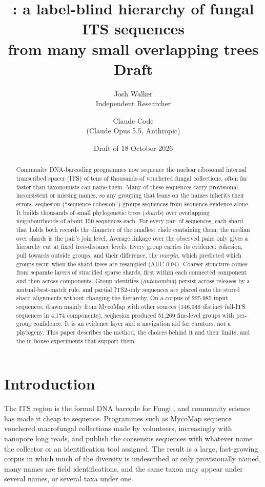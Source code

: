 \documentclass[11pt,a4paper]{article}
\title{\seqhesion: a label-blind hierarchy of fungal ITS sequences\\
from many small overlapping trees\\[0.5ex]
\large Draft}
\author{Josh Walker\\ \small Independent Researcher \and Claude Code\\ \small (Claude Opus 5.5, Anthropic)}
\date{Draft of 18 October 2026}
\newcommand{\seqhesion}{\textsf{seqhesion}}
\begin{document}
\maketitle

\begin{abstract}
Community DNA-barcoding programmes now sequence the nuclear ribosomal internal transcribed spacer
(ITS) of tens of thousands of vouchered fungal collections, often far faster than taxonomists can
name them. Many of these sequences carry provisional, inconsistent or missing names, so any grouping
that leans on the names inherits their errors. \seqhesion{} (``sequence cohesion'') groups sequences
from sequence evidence alone. It builds thousands of small phylogenetic trees (\emph{shards}) over
overlapping neighbourhoods of about 150 sequences each. For every pair of sequences, each shard that
holds both records the diameter of the smallest clade containing them; the median over shards is
the pair's join level. Average linkage over the observed pairs only gives a hierarchy cut at fixed
tree-distance levels. Every group carries its evidence: cohesion, pull towards outside groups, and
their difference, the \emph{margin}, which predicted which groups recur when the shard trees are
resampled (AUC 0.94). Coarser structure comes from separate layers of stratified sparse shards,
first within each connected component and then across components. Group identities
(\emph{antenomina}) persist across releases by a mutual-best-match rule, and partial ITS2-only
sequences are placed onto the stored shard alignments without changing the hierarchy. On a corpus
of 225,985 input sequences, drawn mainly from MycoMap with other sources (146,946 distinct full-ITS sequences in 4,174 components),
\seqhesion{} produced 51,269 fine-level groups with per-group confidence. It is an evidence layer
and a navigation aid for curators, not a phylogeny. This paper describes the method, the choices
behind it and their limits, and the in-house experiments that support them.
\end{abstract}

\section{Introduction}

The ITS region is the formal DNA barcode for Fungi \citep{schoch2012its}, and community science has
made it cheap to sequence. Programmes such as MycoMap sequence vouchered macrofungal collections
made by volunteers, increasingly with nanopore long reads, and publish the consensus sequences
with whatever name the collector or an identification tool assigned. The result is a large,
fast-growing corpus in which much of the diversity is undescribed or only provisionally named, many
names are field identifications, and the same taxon may appear under several names, or several taxa
under one.
\end{document}
